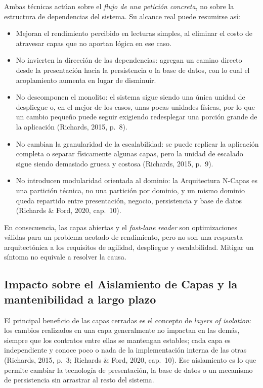 \documentclass[12pt,a4paper]{article}
\begin{document}
Ambas técnicas actúan sobre el \emph{flujo de una petición concreta}, no sobre la estructura de dependencias del sistema. Su alcance real puede resumirse así:

\begin{itemize}[label=$\cdot$]
  \item Mejoran el rendimiento percibido en lecturas simples, al eliminar el costo de atravesar capas que no aportan lógica en ese caso.
  \item No invierten la dirección de las dependencias: agregan un camino directo desde la presentación hacia la persistencia o la base de datos, con lo cual el acoplamiento aumenta en lugar de disminuir.
  \item No descomponen el monolito: el sistema sigue siendo una única unidad de despliegue o, en el mejor de los casos, unas pocas unidades físicas, por lo que un cambio pequeño puede seguir exigiendo redesplegar una porción grande de la aplicación (Richards, 2015, p.~8).
  \item No cambian la granularidad de la escalabilidad: se puede replicar la aplicación completa o separar físicamente algunas capas, pero la unidad de escalado sigue siendo demasiado gruesa y costosa (Richards, 2015, p.~9).
  \item No introducen modularidad orientada al dominio: la Arquitectura N-Capas es una partición técnica, no una partición por dominio, y un mismo dominio queda repartido entre presentación, negocio, persistencia y base de datos (Richards \& Ford, 2020, cap.~10).
\end{itemize}

En consecuencia, las capas abiertas y el \emph{fast-lane reader} son optimizaciones válidas para un problema acotado de rendimiento, pero no son una respuesta arquitectónica a los requisitos de agilidad, despliegue y escalabilidad. Mitigar un síntoma no equivale a resolver la causa.

\subsection{Impacto sobre el Aislamiento de Capas y la mantenibilidad a largo plazo}

El principal beneficio de las capas cerradas es el concepto de \emph{layers of isolation}: los cambios realizados en una capa generalmente no impactan en las demás, siempre que los contratos entre ellas se mantengan estables; cada capa es independiente y conoce poco o nada de la implementación interna de las otras (Richards, 2015, p.~3; Richards \& Ford, 2020, cap.~10). Ese aislamiento es lo que permite cambiar la tecnología de presentación, la base de datos o un mecanismo de persistencia sin arrastrar al resto del sistema.
\end{document}
